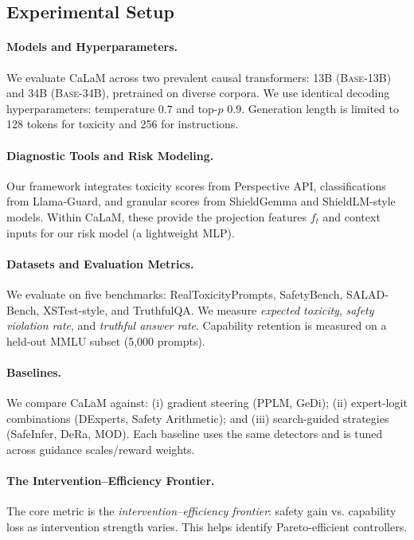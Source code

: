 \documentclass{article}
\theoremstyle{plain}
\theoremstyle{definition}
\theoremstyle{remark}
\begin{document}
\subsection{Experimental Setup}
\label{sec:setup}

\paragraph{Models and Hyperparameters.}
We evaluate CaLaM across two prevalent causal transformers: 13B (\textsc{Base-13B}) and 34B (\textsc{Base-34B}), pretrained on diverse corpora. We use identical decoding hyperparameters: temperature $0.7$ and top-$p$ $0.9$. Generation length is limited to 128 tokens for toxicity and 256 for instructions.

\paragraph{Diagnostic Tools and Risk Modeling.}
Our framework integrates toxicity scores from Perspective API, classifications from Llama-Guard, and granular scores from ShieldGemma and ShieldLM-style models. Within CaLaM, these provide the projection features $f_t$ and context inputs for our risk model (a lightweight MLP).

\paragraph{Datasets and Evaluation Metrics.}
We evaluate on five benchmarks: RealToxicityPrompts, SafetyBench, SALAD-Bench, XSTest-style, and TruthfulQA. We measure \emph{expected toxicity}, \emph{safety violation rate}, and \emph{truthful answer rate}. Capability retention is measured on a held-out MMLU subset (5,000 prompts).

\paragraph{Baselines.}
We compare CaLaM against: (i) gradient steering (PPLM, GeDi); (ii) expert-logit combinations (DExperts, Safety Arithmetic); and (iii) search-guided strategies (SafeInfer, DeRa, MOD). Each baseline uses the same detectors and is tuned across guidance scales/reward weights.

\paragraph{The Intervention--Efficiency Frontier.}
The core metric is the \emph{intervention--efficiency frontier}: safety gain vs. capability loss as intervention strength varies. This helps identify Pareto-efficient controllers.
\end{document}
